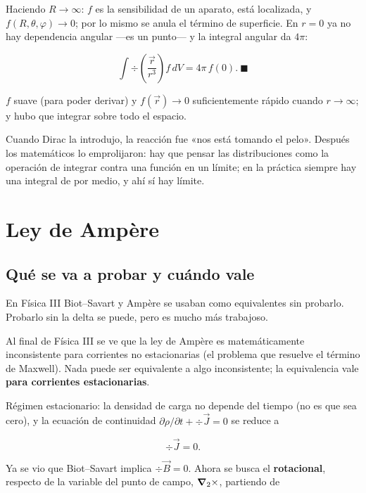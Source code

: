 \documentclass[12pt,a4paper]{article}
\begin{document}
Haciendo $R\to\infty$: $f$ es la sensibilidad de un aparato, está localizada,
y $f(R,\theta,\varphi)\to0$; por lo mismo se anula el término de superficie.
En $r=0$ ya no hay dependencia angular ---es un punto--- y la integral angular da
$4\pi$:

\[
\int \div \!\left(\frac{\vec r}{r^3}\right) f\,dV = 4\pi\,f(0).\ \blacksquare
\]

\begin{warnbox}
$f$ suave (para poder derivar) y $f(\vec r)\to0$
suficientemente rápido cuando $r\to\infty$; y hubo que integrar sobre todo el
espacio.
\end{warnbox}

Cuando Dirac la introdujo, la reacción fue «nos está tomando el pelo». Después
los matemáticos lo emprolijaron: hay que pensar las distribuciones como la
operación de integrar contra una función en un límite; en la práctica siempre
hay una integral de por medio, y ahí sí hay límite.

\section{Ley de Ampère}

\subsection{Qué se va a probar y cuándo vale}

En Física III Biot--Savart y Ampère se usaban como equivalentes sin probarlo.
Probarlo sin la delta se puede, pero es mucho más trabajoso.

\begin{warnbox}[¿Equivalentes?]
Al final de Física III se ve que la ley de Ampère es
matemáticamente inconsistente para corrientes no estacionarias (el problema
que resuelve el término de Maxwell). Nada puede ser equivalente a algo
inconsistente; la equivalencia vale \textbf{para corrientes estacionarias}.
\end{warnbox}

Régimen estacionario: la densidad de carga no depende del tiempo (no es que sea
cero), y la ecuación de continuidad
$\partial\rho/\partial t + \div \vec J = 0$ se reduce a

\[
\div \vec J = 0 .
\]

Ya se vio que Biot--Savart implica $\div \vec B = 0$. Ahora se busca el
\textbf{rotacional}, respecto de la variable del punto de campo, $\vnabla_2\times$,
partiendo de
\end{document}
